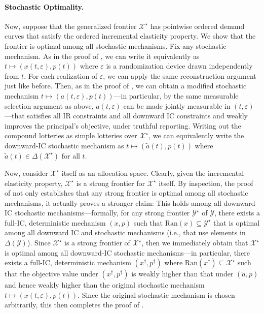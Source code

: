 \documentclass[12pt,letterpaper]{article}
\newenvironment{original}{\color{black}\noindent}{}
\theoremstyle{plain}
\theoremstyle{definition}
\theoremstyle{remark}
\newcommand{\Y}{\mathcal{Y}}
\renewcommand{\1}{\mathds{1}}
\newcommand{\X}{\mathcal{X}}
\theoremstyle{definition}
\begin{document}
\paragraph{Stochastic Optimality.}\hspace{-2mm}\begin{original}Now, suppose that the generalized frontier $\X^\star$ has pointwise ordered demand curves that satisfy the ordered incremental elasticity property. We show that the frontier is optimal among all stochastic mechanisms. Fix any stochastic mechanism. As in the proof of , we can write it equivalently as $t \mapsto (x(t, \varepsilon), p(t))$ where $\varepsilon$ is a randomization device drawn independently from $t$. For each realization of $\varepsilon$, we can apply the same reconstruction argument just like before. Then, as in the proof of , we can obtain a modified stochastic mechanism $t \mapsto (a(t, \varepsilon), p(t))$---in particular, by the same measurable selection argument as above, $a(t, \varepsilon)$ can be made jointly measurable in $(t, \varepsilon)$---that satisfies all IR constraints and all downward IC constraints and weakly improves the principal's objective, under truthful reporting.  Writing out the compound lotteries as simple lotteries over $\X^\star$, we can equivalently write the downward-IC stochastic mechanism as $t \mapsto (\tilde{a}(t), p(t))$ where $\tilde{a}(t) \in \Delta(\X^\star)$ for all $t$.

Now, consider $\X^\star$ itself as an allocation space. Clearly, given the incremental elasticity property, $\X^\star$ is a strong frontier for $\X^\star$ itself. By inspection, the proof of  not only establishes that any strong frontier is optimal among all stochastic mechanisms, it actually proves a stronger claim: This holds among all downward-IC stochastic mechanisms---formally, for any strong frontier $\Y^\star$ of $\Y$, there exists a full-IC, deterministic mechanism $(x, p)$ such that $\text{Ran}(x) \subseteq \Y^\star$ that is optimal among all downward IC and stochastic mechanisms (i.e., that use elements in $\Delta(\mathcal{Y})$). Since $\X^\star$ is a strong frontier of $\X^\star$, then we immediately obtain that $\X^\star$ is optimal among all downward-IC stochastic mechanisms---in particular, there exists a full-IC, deterministic mechanism $(x^\dagger, p^\dagger)$ where $\text{Ran}(x^\dagger) \subseteq \X^\star$ such that the objective value under $(x^\dagger, p^\dagger)$ is weakly higher than that under $(\tilde{a}, p)$ and hence weakly higher than the original stochastic mechanism $t \mapsto (x(t, \varepsilon), p(t))$. Since the original stochastic mechanism is chosen arbitrarily, this then completes the proof of .
\end{original}
\end{document}
